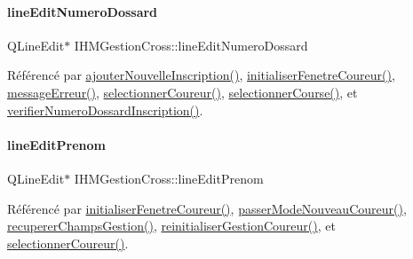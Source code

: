 \mbox{\label{class_i_h_m_gestion_cross_adeb4cfc9a218c06fca5cabc280a611e2}} 
\paragraph{\texorpdfstring{line\+Edit\+Numero\+Dossard}{lineEditNumeroDossard}}
{\footnotesize\ttfamily Q\+Line\+Edit$\ast$ I\+H\+M\+Gestion\+Cross\+::line\+Edit\+Numero\+Dossard\hspace{0.3cm}{\ttfamily [private]}}



Référencé par \hyperlink{class_i_h_m_gestion_cross_af0165d32344af78b4edce59f88c90ff6}{ajouter\+Nouvelle\+Inscription()}, \hyperlink{class_i_h_m_gestion_cross_aa5d9de499a66e52b843c4ef4c6074a60}{initialiser\+Fenetre\+Coureur()}, \hyperlink{class_i_h_m_gestion_cross_a92fa6016b00d2d4429c901e77d37bf10}{message\+Erreur()}, \hyperlink{class_i_h_m_gestion_cross_ad71963d500fd61995fdae94e833db163}{selectionner\+Coureur()}, \hyperlink{class_i_h_m_gestion_cross_ae555b32462455a2cdaf0f8dc2e016d14}{selectionner\+Course()}, et \hyperlink{class_i_h_m_gestion_cross_a164be2d046cf18ee03e3939d03a5580d}{verifier\+Numero\+Dossard\+Inscription()}.

\mbox{\label{class_i_h_m_gestion_cross_a7bea7529f01cf8ca8f365d418aae52d5}} 
\paragraph{\texorpdfstring{line\+Edit\+Prenom}{lineEditPrenom}}
{\footnotesize\ttfamily Q\+Line\+Edit$\ast$ I\+H\+M\+Gestion\+Cross\+::line\+Edit\+Prenom\hspace{0.3cm}{\ttfamily [private]}}



Référencé par \hyperlink{class_i_h_m_gestion_cross_aa5d9de499a66e52b843c4ef4c6074a60}{initialiser\+Fenetre\+Coureur()}, \hyperlink{class_i_h_m_gestion_cross_ac8f336c95a5f0c9eb8a4bc1c4bb83445}{passer\+Mode\+Nouveau\+Coureur()}, \hyperlink{class_i_h_m_gestion_cross_a271efe8d31fbe05fccfb2dc81e71971a}{recuperer\+Champs\+Gestion()}, \hyperlink{class_i_h_m_gestion_cross_a85c44933ec0dcbb591e01c832063367e}{reinitialiser\+Gestion\+Coureur()}, et \hyperlink{class_i_h_m_gestion_cross_ad71963d500fd61995fdae94e833db163}{selectionner\+Coureur()}.

